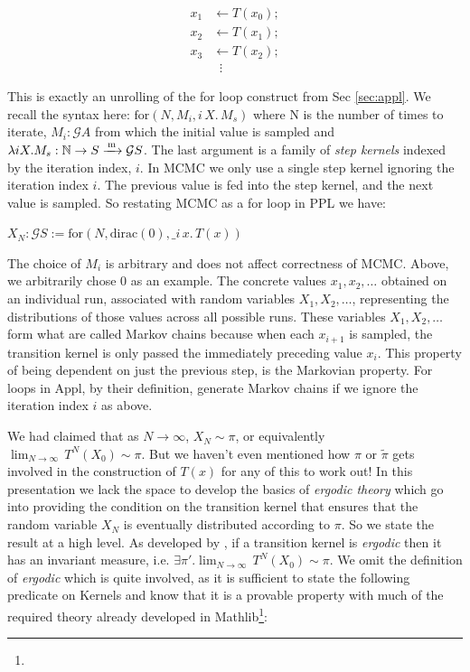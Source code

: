 \[
\begin{aligned}
x_1 &\leftarrow T(x_0); \\
x_2 &\leftarrow T(x_1); \\
x_3 &\leftarrow T(x_2); \\
    &\;\;\vdots
\end{aligned}
\]

This is exactly an unrolling of the for loop construct from Sec \ref{sec:appl}. We recall the syntax here: $\mathrm{for}(N, M_i, i\,X.\,M_s)$ where N is the number of times to iterate, $M_i : \mathcal{G} A$ from which the initial value is sampled and
$\lambda i X. M_s : \mathbb{N} \to S \xrightarrow{\,\mathrm{m}\,} \mathcal{G} S$. The last argument is a family of \emph{step kernels} indexed by the iteration index, $i$. In MCMC we only use a single step kernel ignoring the iteration index $i$. The previous value is fed
into the step kernel, and the next value is sampled. So restating MCMC as a for loop in PPL we have:

$X_N : \mathcal{G} S := \mathrm{for}(N, \mathrm{dirac}(0), \_i\,x.\,T(x))$

The choice of $M_i$ is arbitrary and does not affect correctness of MCMC. Above, we arbitrarily chose 0 as an example. The concrete values $x_1, x_2, \ldots$ obtained on an individual run,
associated with random variables $X_1, X_2, \ldots$, representing the distributions of those values across all possible runs. These variables $X_1, X_2, \ldots$ form what are called
Markov chains because when each $x_{i+1}$ is sampled, the transition kernel is only passed the immediately preceding value $x_i$. This property of being dependent on just the previous step,
is the Markovian property. For loops in Appl, by their definition, generate Markov chains if we ignore the iteration index $i$ as above.

We had claimed that as $N \to \infty$, $X_N \sim \pi$, or equivalently $\lim_{N \to \infty}\, T^N(X_0) \sim \pi$. But we haven't even mentioned how $\pi$ or $\tilde{\pi}$ gets involved in the construction of $T(x)$ for any of this to work out!
In this presentation we lack the space to develop the basics of \emph{ergodic theory} which go into providing the condition on the transition kernel that ensures that the random variable $X_N$
is eventually distributed according to $\pi$. So we state the result at a high level. As developed by \citet{meyn-tweedie}, if a transition kernel is \emph{ergodic} then it has an invariant measure,
i.e. $\exists \pi'. \lim_{N \to \infty}\, T^N(X_0) \sim \pi$. We omit the definition of \emph{ergodic} which is quite involved, as it is sufficient to state the following predicate on Kernels and know that it is a provable
property with much of the required theory already developed in Mathlib\footnote{}:

